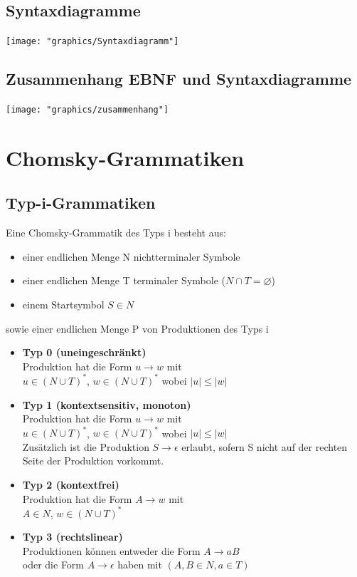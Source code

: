 \documentclass{scrreprt}
\begin{document}
\subsection{Syntaxdiagramme}
\texttt{[image: "graphics/Syntaxdiagramm"]}
\subsection{Zusammenhang EBNF und Syntaxdiagramme}
\texttt{[image: "graphics/zusammenhang"]}
\section{Chomsky-Grammatiken}
\subsection{Typ-i-Grammatiken}
Eine Chomsky-Grammatik des Typs i besteht aus:
\begin{itemize}
    \item einer endlichen Menge N nichtterminaler Symbole
    \item einer endlichen Menge T terminaler Symbole ($N \cap T = \varnothing$)
    \item einem Startsymbol $S \in N$
\end{itemize}
sowie einer endlichen Menge P von Produktionen des Typs i
\begin{itemize}
    \item \textbf{Typ 0 (uneingeschränkt)}
    \\Produktion hat die Form \textbf{$u \rightarrow w$} mit
    \\$u \in (N \cup T)^{*}$, $w \in (N \cup T)^{*}$ wobei $|u| \leq |w|$
    \item \textbf{Typ 1 (kontextsensitiv, monoton)}
    \\Produktion hat die Form \textbf{$u \rightarrow w$} mit
    \\$u \in (N \cup T)^{*}$, $w \in (N \cup T)^{*}$ wobei $|u| \leq |w|$
    \\Zusätzlich ist die Produktion $S \rightarrow \epsilon$ erlaubt, sofern S nicht auf der rechten Seite der Produktion vorkommt.
    \item \textbf{Typ 2 (kontextfrei)}
    \\Produktion hat die Form \textbf{$A \rightarrow w$} mit
    \\$A \in N$, $w \in (N \cup T)^{*}$
    \item \textbf{Typ 3 (rechtslinear)}
    \\Produktionen können entweder die Form \textbf{$A \rightarrow aB$}
    \\oder die Form \textbf{$A \rightarrow \epsilon$} haben mit $(A,B \in N, a \in T)$
\end{itemize}
\end{document}
